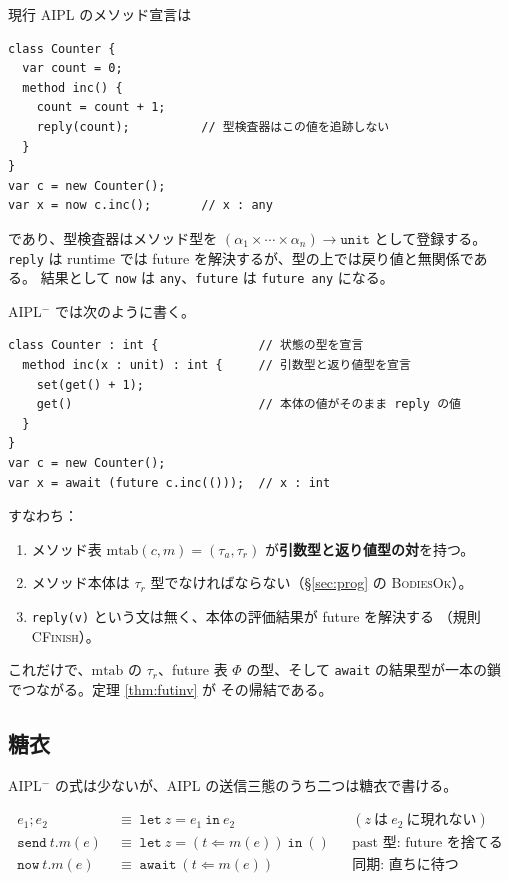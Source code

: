 \documentclass[11pt,a4paper]{ltjsarticle}
\theoremstyle{definition}
\theoremstyle{remark}
\newcommand{\tunit}{\mathtt{unit}}
\newcommand{\Ph}{\Phi}            %
\newcommand{\mtab}{\mathrm{mtab}}
\newcommand{\efsend}[3]{#1 \Leftarrow #2(#3)}
\begin{document}
現行 AIPL のメソッド宣言は

\begin{lstlisting}[language=AIPL]
class Counter {
  var count = 0;
  method inc() {
    count = count + 1;
    reply(count);          // 型検査器はこの値を追跡しない
  }
}
var c = new Counter();
var x = now c.inc();       // x : any
\end{lstlisting}

であり、型検査器はメソッド型を
$(\alpha_1 \times \cdots \times \alpha_n) \to \tunit$ として登録する。
\verb|reply| は runtime では future を解決するが、型の上では戻り値と無関係である。
結果として \verb|now| は \verb|any|、\verb|future| は \verb|future any| になる。

AIPL$^-$ では次のように書く。

\begin{lstlisting}[language=AIPL]
class Counter : int {              // 状態の型を宣言
  method inc(x : unit) : int {     // 引数型と返り値型を宣言
    set(get() + 1);
    get()                          // 本体の値がそのまま reply の値
  }
}
var c = new Counter();
var x = await (future c.inc(()));  // x : int
\end{lstlisting}

すなわち：

\begin{enumerate}
\item メソッド表 $\mtab(c, m) = (\tau_a, \tau_r)$ が\textbf{引数型と返り値型の対}を持つ。
\item メソッド本体は $\tau_r$ 型でなければならない（\S\ref{sec:prog} の
      \textsc{BodiesOk}）。
\item \verb|reply(v)| という文は無く、本体の評価結果が future を解決する
      （規則 \textsc{CFinish}）。
\end{enumerate}

これだけで、$\mtab$ の $\tau_r$、future 表 $\Ph$ の型、そして
\verb|await| の結果型が一本の鎖でつながる。定理 \ref{thm:futinv} が
その帰結である。

\subsection{糖衣}
\label{sec:sugar}

AIPL$^-$ の式は少ないが、AIPL の送信三態のうち二つは糖衣で書ける。

\begin{align*}
e_1 ; e_2 &\;\equiv\; \mathtt{let}\ z = e_1\ \mathtt{in}\ e_2
  &&(z\ \text{は}\ e_2\ \text{に現れない})\\
\mathtt{send}\ t.m(e) &\;\equiv\;
  \mathtt{let}\ z = (\efsend{t}{m}{e})\ \mathtt{in}\ ()
  &&\text{past 型: future を捨てる}\\
\mathtt{now}\ t.m(e) &\;\equiv\; \mathtt{await}\ (\efsend{t}{m}{e})
  &&\text{同期: 直ちに待つ}
\end{align*}
\end{document}
